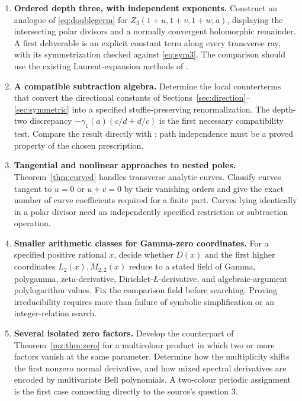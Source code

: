\begin{enumerate}[leftmargin=*,label=\textbf{Q\arabic*.},itemsep=8pt]
\item \textbf{Ordered depth three, with independent exponents.}
Construct an analogue of \eqref{eq:doublegerm} for
$Z_3(1+u,1+v,1+w;a)$, displaying the intersecting polar divisors and
a normally convergent holomorphic remainder. A first deliverable is
an explicit constant term along every transverse ray, with its
symmetrization checked against \eqref{eq:sym3}. The comparison should
use the existing Laurent-expansion methods of \cite{mow}.

\item \textbf{A compatible subtraction algebra.}
Determine the local counterterms that convert the directional constants
of Sections~\ref{sec:direction}--\ref{sec:symmetric} into a specified
stuffle-preserving renormalization. The depth-two discrepancy
$-\gamma_1(a)(c/d+d/c)$ is the first necessary compatibility test.
Compare the result directly with \cite{guozhang}; path independence
must be a proved property of the chosen prescription.

\item \textbf{Tangential and nonlinear approaches to nested poles.}
Theorem~\ref{thm:curved} handles transverse analytic curves. Classify
curves tangent to $u=0$ or $u+v=0$ by their vanishing orders and give
the exact number of curve coefficients required for a finite part.
Curves lying identically in a polar divisor need an independently
specified restriction or subtraction operation.

\item \textbf{Smaller arithmetic classes for Gamma-zero coordinates.}
For a specified positive rational $x$, decide whether $D(x)$ and the
first higher coordinates $L_2(x),M_{2,2}(x)$ reduce to a stated field
of Gamma, polygamma, zeta-derivative, Dirichlet-$L$-derivative, and
algebraic-argument polylogarithm values. Fix the comparison field
before searching. Proving irreducibility requires more than failure
of symbolic simplification or an integer-relation search.

\item \textbf{Several isolated zero factors.}
Develop the counterpart of Theorem~\ref{mz:thm:zero} for a
multicolour product in which two or more factors vanish at the same
parameter. Determine how the multiplicity shifts the first nonzero
normal derivative, and how mixed spectral derivatives are encoded
by multivariate Bell polynomials. A two-colour periodic assignment
is the first case connecting directly to the source's question 3.


\end{enumerate}
